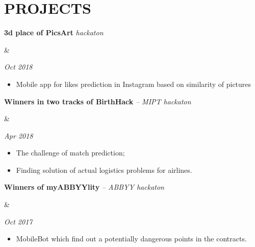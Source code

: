 \documentclass[11pt,a4paper,roman]{moderncv}
\newcommand*{\cvcourse}[3]{
    \parbox[t]{0.78\textwidth}{
    {\bfseries #2} \\ {\itshape #3}
    }&\parbox[t]{0.22\textwidth}{
    \hfill {\itshape #1}}
}
\newcommand*{\cvhack}[3]{
    \parbox[t]{0.78\textwidth}{
    {\bfseries #2} {\itshape #3}
    }&\parbox[t]{0.22\textwidth}{
    \hfill {\itshape #1}}
}
\begin{document}

\section{PROJECTS}

{\cvhack{Oct 2018}
        {3d place of PicsArt}
        {hackaton}
{\begin{itemize}
  \item Mobile app for likes prediction in Instagram based on similarity of pictures
\end{itemize}}}

{\cvhack{Apr 2018}
        {Winners in two tracks of BirthHack}
        {-- MIPT hackaton}
{\begin{itemize}
  \item The challenge of match prediction;
  \item Finding solution of actual logistics problems for airlines.
\end{itemize}}}

{\cvhack{Oct 2017}
        {Winners of myABBYYlity}
        {-- ABBYY hackaton}
{\begin{itemize}
  \item MobileBot which find out a potentially dangerous points in the contracts.
\end{itemize}}}



% 
% 
\end{document}
